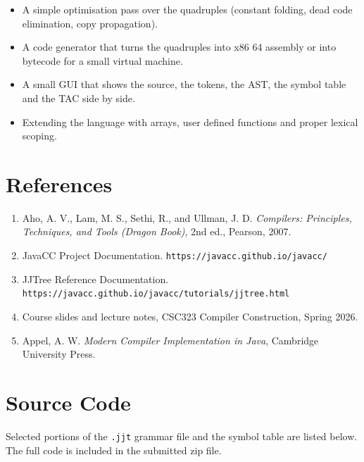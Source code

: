 \documentclass[12pt,a4paper]{report}
\begin{document}
\begin{itemize}
\item A simple optimisation pass over the quadruples (constant folding, dead code elimination, copy propagation).
\item A code generator that turns the quadruples into x86 64 assembly or into bytecode for a small virtual machine.
\item A small GUI that shows the source, the tokens, the AST, the symbol table and the TAC side by side.
\item Extending the language with arrays, user defined functions and proper lexical scoping.
\end{itemize}

\chapter*{References}

\begin{enumerate}
\item Aho, A. V., Lam, M. S., Sethi, R., and Ullman, J. D. \emph{Compilers: Principles, Techniques, and Tools (Dragon Book)}, 2nd ed., Pearson, 2007.
\item JavaCC Project Documentation. \texttt{https://javacc.github.io/javacc/}
\item JJTree Reference Documentation. \texttt{https://javacc.github.io/javacc/tutorials/jjtree.html}
\item Course slides and lecture notes, CSC323 Compiler Construction, Spring 2026.
\item Appel, A. W. \emph{Modern Compiler Implementation in Java}, Cambridge University Press.
\end{enumerate}

\appendix

\chapter{Source Code}

Selected portions of the \texttt{.jjt} grammar file and the symbol table are listed below. The full code is included in the submitted zip file.
\end{document}
